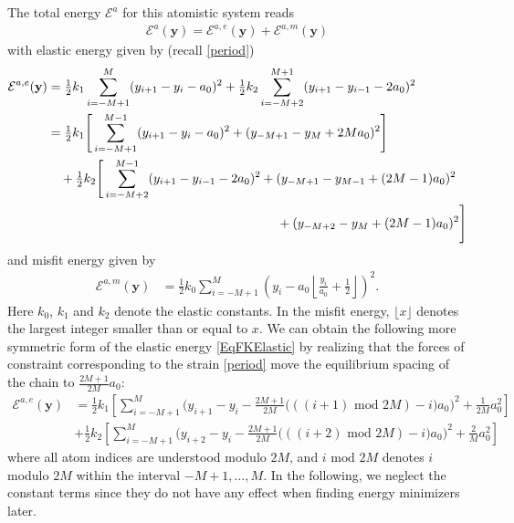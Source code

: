 \documentclass[11pt,reqno,oneside]{amsart}
\numberwithin{equation}{section}
\begin{document}
The total energy ${\mathcal{E}}^a$ for this atomistic system reads
\begin{align} \label{EqFK}
{\mathcal{E}}^{a}({\mathbf{y}}) = {\mathcal{E}}^{a,e}({\mathbf{y}}) + {\mathcal{E}}^{a,m}({\mathbf{y}})
\end{align}
with elastic energy given by (recall \eqref{period})
\begin{equation}\label{EqFKElastic}
\begin{split}
{\mathcal{E}}^{a,e}({\mathbf{y}})&=
{{\textstyle \frac{1}{2}}} k_1  \sum_{i=-M+1}^{M} (y_{i+1} - y_i - a_0)^2
+ {{\textstyle \frac{1}{2}}} k_2  \sum_{i=-M+2}^{M+1} (y_{i+1} - y_{i-1} - 2a_0)^2\\
& = {{\textstyle \frac{1}{2}}} k_1 \Bigg[ \sum_{i=-M+1}^{M-1} (y_{i+1} - y_i - a_0)^2
                    + (y_{-M+1} - y_M + 2M a_0)^2 \Bigg] \\
& \quad + {{\textstyle \frac{1}{2}}} k_2 \Bigg[ \sum_{i=-M+2}^{M-1} (y_{i+1} - y_{i-1} - 2a_0)^2
                    + (y_{-M+1} - y_{M-1} + (2M-1)a_0)^2 \\
& \hspace{63.5mm}     + (y_{-M+2} - y_{M} + (2M-1)a_0)^2 \Bigg]
\end{split}
\end{equation}
and misfit energy given by
\begin{align} \label{EqFKMisfit1}
{\mathcal{E}}^{a,m}({\mathbf{y}})
& = {{\textstyle \frac{1}{2}}} k_0 \sum_{i=-M+1}^M \left( y_i - a_0 \left\lfloor
   \frac{y_i}{a_0} + \frac{1}{2} \right\rfloor \right)^2.
\end{align}
Here $k_0$, $k_1$ and $k_2$ denote the elastic constants.
In the misfit energy, $\lfloor x \rfloor$ denotes the largest
integer smaller than or equal to
$x.$
We can obtain the following more symmetric form of the elastic energy \eqref{EqFKElastic}
by realizing that the forces of constraint corresponding to the strain \eqref{period}
move the equilibrium spacing of the chain to $\frac{2M+1}{2M}a_0:$
\begin{equation}\label{symm}
\begin{split}
{\mathcal{E}}^{a,e}({\mathbf{y}})&=
{{\textstyle \frac{1}{2}}} k_1 \left[ \sum_{i=-M+1}^{M}
\Big( y_{i+1} - y_i - {\textstyle \frac{2M+1}{2M}}
\big(\left(\left(i+1\right) \text{ mod } 2M\right)-i\big) a_0 \Big)^2
+ {\textstyle \frac{1}{2M}}a_0^2 \right]\\
\qquad&+{{\textstyle \frac{1}{2}}} k_2 \left[ \sum_{i=-M+1}^{M} \Big( y_{i+2} - y_i - {\textstyle \frac{2M+1}{2M}}
 \big(\left(\left(i+2\right) \text{ mod } 2M\right)-i\big) a_0 \Big)^2
+   {\textstyle \frac{2}{M}}a_0^2 \right]
\end{split}
\end{equation}
where all atom indices are understood modulo $2M$, and $i \text{ mod } 2M$
denotes $i$ modulo $2M$ within the interval $-M+1,\ldots,M$. In the following,
we neglect the constant terms since they do not have any effect when
finding energy minimizers later.
\end{document}
